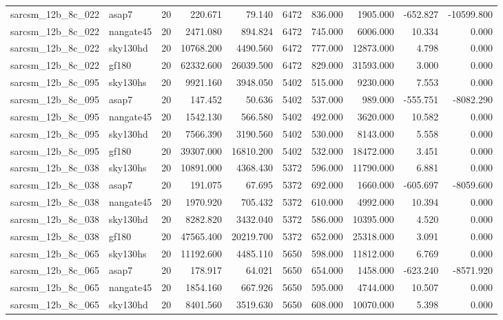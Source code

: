 \documentclass{article}
\begin{document}
\begin{longtable}{llrrrrrrrr}
sarcsm\_12b\_8c\_022 & asap7 & 20 & 220.671 & 79.140 & 6472 & 836.000 & 1905.000 & -652.827 & -10599.800 \\
sarcsm\_12b\_8c\_022 & nangate45 & 20 & 2471.080 & 894.824 & 6472 & 745.000 & 6006.000 & 10.334 & 0.000 \\
sarcsm\_12b\_8c\_022 & sky130hd & 20 & 10768.200 & 4490.560 & 6472 & 777.000 & 12873.000 & 4.798 & 0.000 \\
sarcsm\_12b\_8c\_022 & gf180 & 20 & 62332.600 & 26039.500 & 6472 & 829.000 & 31593.000 & 3.000 & 0.000 \\
sarcsm\_12b\_8c\_095 & sky130hs & 20 & 9921.160 & 3948.050 & 5402 & 515.000 & 9230.000 & 7.553 & 0.000 \\
sarcsm\_12b\_8c\_095 & asap7 & 20 & 147.452 & 50.636 & 5402 & 537.000 & 989.000 & -555.751 & -8082.290 \\
sarcsm\_12b\_8c\_095 & nangate45 & 20 & 1542.130 & 566.580 & 5402 & 492.000 & 3620.000 & 10.582 & 0.000 \\
sarcsm\_12b\_8c\_095 & sky130hd & 20 & 7566.390 & 3190.560 & 5402 & 530.000 & 8143.000 & 5.558 & 0.000 \\
sarcsm\_12b\_8c\_095 & gf180 & 20 & 39307.000 & 16810.200 & 5402 & 532.000 & 18472.000 & 3.451 & 0.000 \\
sarcsm\_12b\_8c\_038 & sky130hs & 20 & 10891.000 & 4368.430 & 5372 & 596.000 & 11790.000 & 6.881 & 0.000 \\
sarcsm\_12b\_8c\_038 & asap7 & 20 & 191.075 & 67.695 & 5372 & 692.000 & 1660.000 & -605.697 & -8059.600 \\
sarcsm\_12b\_8c\_038 & nangate45 & 20 & 1970.920 & 705.432 & 5372 & 610.000 & 4992.000 & 10.394 & 0.000 \\
sarcsm\_12b\_8c\_038 & sky130hd & 20 & 8282.820 & 3432.040 & 5372 & 586.000 & 10395.000 & 4.520 & 0.000 \\
sarcsm\_12b\_8c\_038 & gf180 & 20 & 47565.400 & 20219.700 & 5372 & 652.000 & 25318.000 & 3.091 & 0.000 \\
sarcsm\_12b\_8c\_065 & sky130hs & 20 & 11192.600 & 4485.110 & 5650 & 598.000 & 11812.000 & 6.769 & 0.000 \\
sarcsm\_12b\_8c\_065 & asap7 & 20 & 178.917 & 64.021 & 5650 & 654.000 & 1458.000 & -623.240 & -8571.920 \\
sarcsm\_12b\_8c\_065 & nangate45 & 20 & 1854.160 & 667.926 & 5650 & 595.000 & 4744.000 & 10.507 & 0.000 \\
sarcsm\_12b\_8c\_065 & sky130hd & 20 & 8401.560 & 3519.630 & 5650 & 608.000 & 10070.000 & 5.398 & 0.000 \\

\end{longtable}
\end{document}
